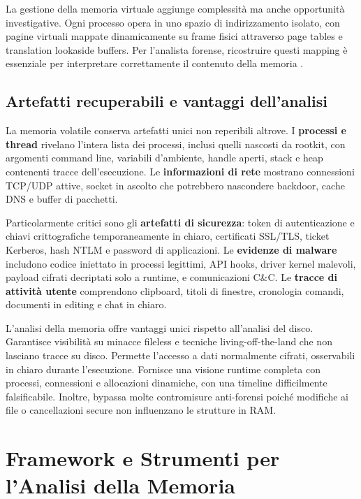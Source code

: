La gestione della memoria virtuale aggiunge complessità ma anche opportunità investigative. Ogni processo opera in uno spazio di indirizzamento isolato, con pagine virtuali mappate dinamicamente su frame fisici attraverso page tables e translation lookaside buffers. Per l'analista forense, ricostruire questi mapping è essenziale per interpretare correttamente il contenuto della memoria \cite{case2017}.

\subsection{Artefatti recuperabili e vantaggi dell'analisi}

La memoria volatile conserva artefatti unici non reperibili altrove. I \textbf{processi e thread} rivelano l'intera lista dei processi, inclusi quelli nascosti da rootkit, con argomenti command line, variabili d'ambiente, handle aperti, stack e heap contenenti tracce dell'esecuzione. Le \textbf{informazioni di rete} mostrano connessioni TCP/UDP attive, socket in ascolto che potrebbero nascondere backdoor, cache DNS e buffer di pacchetti.

Particolarmente critici sono gli \textbf{artefatti di sicurezza}: token di autenticazione e chiavi crittografiche temporaneamente in chiaro, certificati SSL/TLS, ticket Kerberos, hash NTLM e password di applicazioni. Le \textbf{evidenze di malware} includono codice iniettato in processi legittimi, API hooks, driver kernel malevoli, payload cifrati decriptati solo a runtime, e comunicazioni C\&C. Le \textbf{tracce di attività utente} comprendono clipboard, titoli di finestre, cronologia comandi, documenti in editing e chat in chiaro.

L'analisi della memoria offre vantaggi unici rispetto all'analisi del disco. Garantisce visibilità su minacce fileless e tecniche living-off-the-land che non lasciano tracce su disco. Permette l'accesso a dati normalmente cifrati, osservabili in chiaro durante l'esecuzione. Fornisce una visione runtime completa con processi, connessioni e allocazioni dinamiche, con una timeline difficilmente falsificabile. Inoltre, bypassa molte contromisure anti-forensi poiché modifiche ai file o cancellazioni secure non influenzano le strutture in RAM.

\section{Framework e Strumenti per l'Analisi della Memoria}

